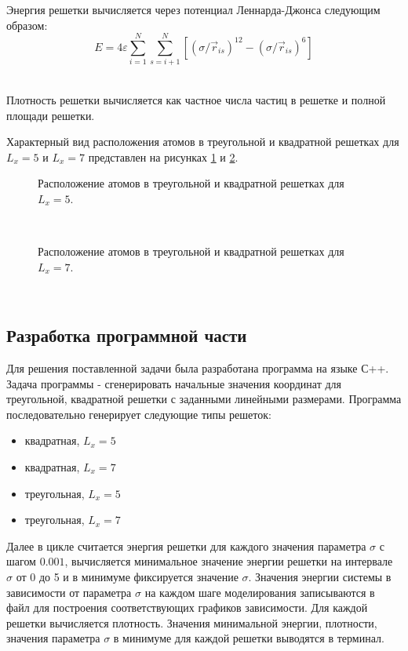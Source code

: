 \documentclass[14pt,a4paper,report]{ncc}
\begin{document}
Энергия решетки вычисляется через потенциал Леннарда-Джонса следующим образом:
\begin{equation}
E=4 \varepsilon \sum\limits_{i=1}^N \sum\limits_{s=i+1}^N{ [(\sigma/\vec{r}_{is})^{12} - (\sigma/\vec{r}_{is})^{6}  ]}
\end{equation}
\

Плотность решетки вычисляется как частное числа частиц в решетке и полной площади решетки.

Характерный вид расположения атомов в треугольной и квадратной решетках для $L_x=5$ и $L_x=7$ представлен на рисунках \ref{ris:image1} и \ref{ris:image2}. 
\begin{figure}[h]
\caption{Расположение атомов в треугольной и квадратной решетках для $L_x=5$.}
\label{ris:image1}
\end{figure}
\

\begin{figure}[h]
\caption{Расположение атомов в треугольной и квадратной решетках для $L_x=7$.}
\label{ris:image2}
\end{figure}
\
\subsection{Разработка программной части}
Для решения поставленной задачи была разработана программа на языке С++. Задача программы - сгенерировать начальные значения координат для треугольной, квадратной решетки с заданными линейными размерами.
Программа последовательно генерирует следующие типы решеток:
\begin{itemize}
\item квадратная, {$L_x=5$}
\item квадратная, {$L_x=7$}
\item треугольная, {$L_x=5$}
\item треугольная, {$L_x=7$}
\end{itemize}
Далее в цикле считается энергия решетки для каждого значения параметра $\sigma$ с шагом $0.001$, вычисляется минимальное значение энергии решетки на интервале $\sigma$ от 0 до 5 и в минимуме фиксируется значение $\sigma$. Значения энергии системы в зависимости от параметра $\sigma$ на каждом шаге моделирования записываются в файл для построения соответствующих графиков зависимости. Для каждой решетки вычисляется плотность. 
Значения минимальной энергии, плотности, значения параметра $\sigma$ в минимуме для каждой решетки выводятся в терминал. 
\end{document}
